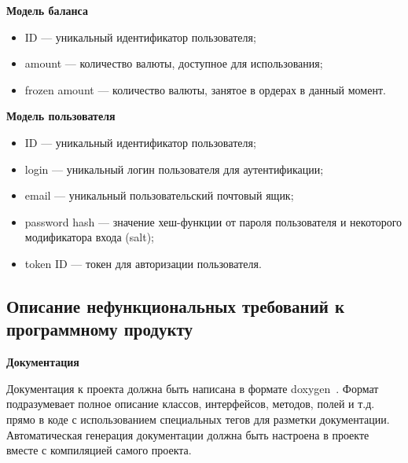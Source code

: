 \textbf{Модель баланса}

\begin{itemize}
    \item ID — уникальный идентификатор пользователя;
    \item amount — количество валюты, доступное для использования;
    \item frozen amount — количество валюты, занятое в ордерах в данный момент.
\end{itemize}

\textbf{Модель пользователя}

\begin{itemize}
    \item ID — уникальный идентификатор пользователя;
    \item login — уникальный логин пользователя для аутентификации;
    \item email — уникальный пользовательский почтовый ящик;
    \item password hash — значение хеш-функции от пароля пользователя и некоторого модификатора входа (salt);
    \item token ID — токен для авторизации пользователя.
\end{itemize}

\subsection{Описание нефункциональных требований к программному продукту}\label{sec:domain:nonfunc}

\textbf{Документация}

Документация к проекта должна быть написана в формате doxygen~\cite{doxygen}. Формат подразумевает полное описание классов, интерфейсов, методов, полей и т.д. прямо в коде с использованием специальных тегов для разметки документации. Автоматическая генерация документации должна быть настроена в проекте вместе с компиляцией самого проекта.

